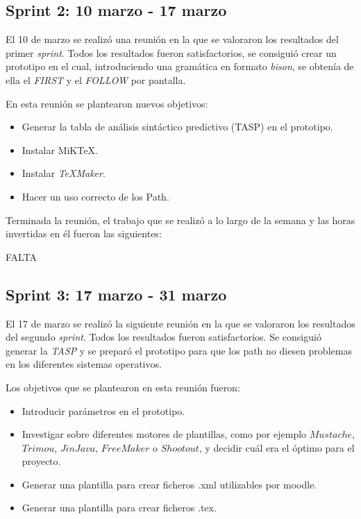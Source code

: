 \subsection{Sprint 2: 10 marzo - 17 marzo}

El 10 de marzo se realizó una reunión en la que se valoraron los resultados del primer \textit{sprint}. Todos los resultados fueron satisfactorios, se consiguió crear un prototipo en el cual, introduciendo una gramática en formato \textit{bison}, se obtenía de ella el \textit{FIRST} y el \textit{FOLLOW} por pantalla.

En esta reunión se plantearon nuevos objetivos: 

\begin{itemize}
\item Generar la tabla de análisis sintáctico predictivo (TASP) en el prototipo.
\item Instalar MiK\TeX{}.
\item Instalar \textit{\TeX{}Maker}.
\item Hacer un uso correcto de los Path.
 
\end{itemize}

Terminada la reunión, el trabajo que se realizó a lo largo de la semana y las horas invertidas en él fueron las siguientes:

FALTA 

\subsection{Sprint 3: 17 marzo - 31 marzo}

El 17 de marzo se realizó la siguiente reunión en la que se valoraron los resultados del segundo \textit{sprint}. Todos los resultados fueron satisfactorios. Se consiguió generar la \textit{TASP} y se preparó el prototipo para que los path no diesen problemas en los diferentes sistemas operativos.
 
Los objetivos que se plantearon en esta reunión fueron:

\begin{itemize}
\item Introducir parámetros en el prototipo.
\item Investigar sobre diferentes motores de plantillas, como por ejemplo $Mustache$, $Trimou$, $JinJava$, $FreeMaker$ o $Shootout$, y decidir cuál era el óptimo para el proyecto.
\item Generar una plantilla para crear ficheros .xml utilizables por moodle.
\item Generar una plantilla para crear ficheros .tex. 
\end{itemize}

